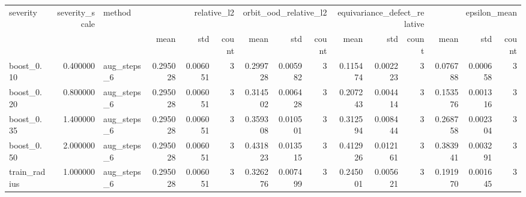 \begin{tabular}{lrlrrrrrrrrrrrr}
\toprule
severity & severity_scale & method & \multicolumn{3}{r}{relative_l2} & \multicolumn{3}{r}{orbit_ood_relative_l2} & \multicolumn{3}{r}{equivariance_defect_relative} & \multicolumn{3}{r}{epsilon_mean} \\
 &  &  & mean & std & count & mean & std & count & mean & std & count & mean & std & count \\
\midrule
boost_0.10 & 0.400000 & aug_steps_6 & 0.295028 & 0.006051 & 3 & 0.299728 & 0.005982 & 3 & 0.115474 & 0.002223 & 3 & 0.076788 & 0.000658 & 3 \\
boost_0.20 & 0.800000 & aug_steps_6 & 0.295028 & 0.006051 & 3 & 0.314502 & 0.006428 & 3 & 0.207243 & 0.004414 & 3 & 0.153576 & 0.001316 & 3 \\
boost_0.35 & 1.400000 & aug_steps_6 & 0.295028 & 0.006051 & 3 & 0.359308 & 0.010501 & 3 & 0.312594 & 0.008444 & 3 & 0.268758 & 0.002304 & 3 \\
boost_0.50 & 2.000000 & aug_steps_6 & 0.295028 & 0.006051 & 3 & 0.431823 & 0.013515 & 3 & 0.412926 & 0.012161 & 3 & 0.383941 & 0.003291 & 3 \\
train_radius & 1.000000 & aug_steps_6 & 0.295028 & 0.006051 & 3 & 0.326276 & 0.007499 & 3 & 0.245001 & 0.005621 & 3 & 0.191970 & 0.001645 & 3 \\
\bottomrule
\end{tabular}
